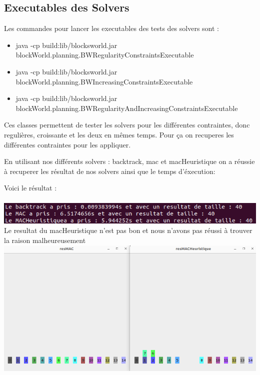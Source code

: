 \documentclass[12pt]{article}
\begin{document}
		\subsection{Executables des Solvers}
			Les commandes pour lancer les executables des tests des solvers sont :
			\begin{itemize}
				\item java -cp build:lib/blocksworld.jar \\blockWorld.planning.BWRegularityConstraintsExecutable
				\item java -cp build:lib/blocksworld.jar \\blockWorld.planning.BWIncreasingConstraintsExecutable
				\item java -cp build:lib/blocksworld.jar \\ blockWorld.planning.BWRegularityAndIncreasingConstraintsExecutable
			\end{itemize}
			Ces classes permettent de tester les solvers pour les différentes contraintes, donc regulières, croissante et les deux en mêmes temps. Pour ça on recuperes les différentes contraintes pour les appliquer.
			
			En utilisant nos différents solvers : backtrack, mac et macHeuristique on a réussie à recuperer les résultat de nos solvers ainsi que le temps d'éxecution: 
			 \newpage
			
			Voici le résultat :\\\\
			\includegraphics[width=1\textwidth]{image/resSolver.png}
			Le resultat du macHeuristique n'est pas bon et nous n'avons pas réussi à trouver la raison malheureusement\\
			\includegraphics[width=1\textwidth]{image/erreur.png}
		
\end{document}
